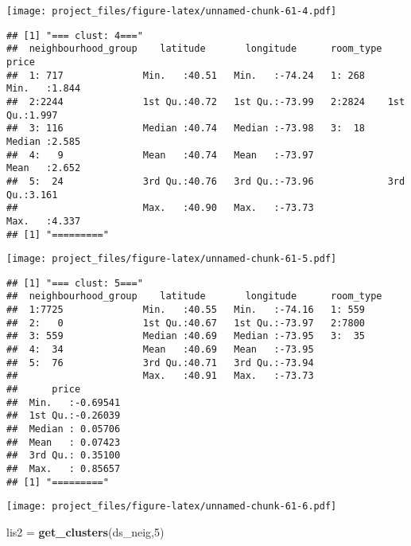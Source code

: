 \documentclass[
]{article}
\newenvironment{Shaded}{\begin{snugshade}}{\end{snugshade}}
\newcommand{\DecValTok}[1]{\textcolor[rgb]{0.00,0.00,0.81}{#1}}
\newcommand{\KeywordTok}[1]{\textcolor[rgb]{0.13,0.29,0.53}{\textbf{#1}}}
\newcommand{\NormalTok}[1]{#1}
\newcommand{\OperatorTok}[1]{\textcolor[rgb]{0.81,0.36,0.00}{\textbf{#1}}}
\newcommand{\StringTok}[1]{\textcolor[rgb]{0.31,0.60,0.02}{#1}}
\begin{document}
\texttt{[image: project\_files/figure-latex/unnamed-chunk-61-4.pdf]}

\begin{verbatim}
## [1] "=== clust: 4==="
##  neighbourhood_group    latitude       longitude      room_type     price      
##  1: 717              Min.   :40.51   Min.   :-74.24   1: 268    Min.   :1.844  
##  2:2244              1st Qu.:40.72   1st Qu.:-73.99   2:2824    1st Qu.:1.997  
##  3: 116              Median :40.74   Median :-73.98   3:  18    Median :2.585  
##  4:   9              Mean   :40.74   Mean   :-73.97             Mean   :2.652  
##  5:  24              3rd Qu.:40.76   3rd Qu.:-73.96             3rd Qu.:3.161  
##                      Max.   :40.90   Max.   :-73.73             Max.   :4.337  
## [1] "========="
\end{verbatim}

\texttt{[image: project\_files/figure-latex/unnamed-chunk-61-5.pdf]}

\begin{verbatim}
## [1] "=== clust: 5==="
##  neighbourhood_group    latitude       longitude      room_type
##  1:7725              Min.   :40.55   Min.   :-74.16   1: 559   
##  2:   0              1st Qu.:40.67   1st Qu.:-73.97   2:7800   
##  3: 559              Median :40.69   Median :-73.95   3:  35   
##  4:  34              Mean   :40.69   Mean   :-73.95            
##  5:  76              3rd Qu.:40.71   3rd Qu.:-73.94            
##                      Max.   :40.91   Max.   :-73.73            
##      price         
##  Min.   :-0.69541  
##  1st Qu.:-0.26039  
##  Median : 0.05706  
##  Mean   : 0.07423  
##  3rd Qu.: 0.35100  
##  Max.   : 0.85657  
## [1] "========="
\end{verbatim}

\begin{Shaded}
\end{Shaded}

\texttt{[image: project\_files/figure-latex/unnamed-chunk-61-6.pdf]}

\begin{Shaded}
\begin{Highlighting}[]
\NormalTok{lis2 =}\StringTok{ }\KeywordTok{get_clusters}\NormalTok{(ds_neig,}\DecValTok{5}\NormalTok{)}
\end{Highlighting}
\end{Shaded}
\end{document}
